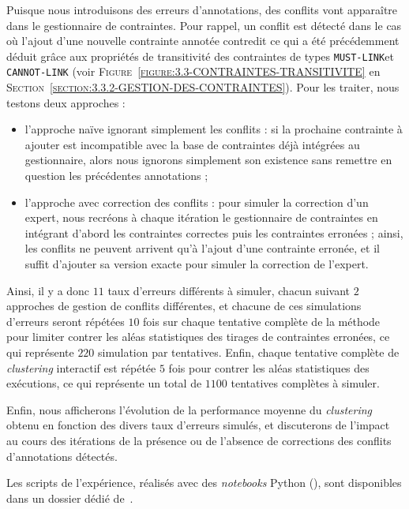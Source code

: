 			Puisque nous introduisons des erreurs d'annotations, des conflits vont apparaître dans le gestionnaire de contraintes.
			Pour rappel, un conflit est détecté dans le cas où l'ajout d'une nouvelle contrainte annotée contredit ce qui a été précédemment déduit grâce aux propriétés de transitivité des contraintes de types \texttt{MUST-LINK}et \texttt{CANNOT-LINK} (voir \textsc{Figure~\ref{figure:3.3-CONTRAINTES-TRANSITIVITE}} en \textsc{Section~\ref{section:3.3.2-GESTION-DES-CONTRAINTES}}).
			Pour les traiter, nous testons deux approches :
			\begin{itemize}
				\item l'approche naïve ignorant simplement les conflits : si la prochaine contrainte à ajouter est incompatible avec la base de contraintes déjà intégrées au gestionnaire, alors nous ignorons simplement son existence sans remettre en question les précédentes annotations ;
				\item l'approche avec correction des conflits : pour simuler la correction d'un expert, nous recréons à chaque itération le gestionnaire de contraintes en intégrant d'abord les contraintes correctes puis les contraintes erronées ; ainsi, les conflits ne peuvent arrivent qu'à l'ajout d'une contrainte erronée, et il suffit d'ajouter sa version exacte pour simuler la correction de l'expert.
			\end{itemize}
			
			Ainsi, il y a donc $11$ taux d'erreurs différents à simuler, chacun suivant $2$ approches de gestion de conflits différentes, et chacune de ces simulations d'erreurs seront répétées $10$ fois sur chaque tentative complète de la méthode pour limiter contrer les aléas statistiques des tirages de contraintes erronées, ce qui représente $220$ simulation par tentatives.
			Enfin, chaque tentative complète de \textit{clustering} interactif est répétée $5$ fois pour contrer les aléas statistiques des exécutions, ce qui représente un total de $1100$ tentatives complètes à simuler.

			Enfin, nous afficherons l'évolution de la performance moyenne du \textit{clustering} obtenu en fonction des divers taux d'erreurs simulés, et discuterons de l'impact au cours des itérations de la présence ou de l'absence de corrections des conflits d'annotations détectés.
			
			\begin{leftBarInformation}
				Les scripts de l'expérience, réalisés avec des \textit{notebooks} Python (\cite{van-rossum-drake:2009:python-reference-manual}), sont disponibles dans un dossier dédié de~\cite{schild:2021:cognitivefactory-interactiveclusteringcomparativestudy}.
			\end{leftBarInformation}

